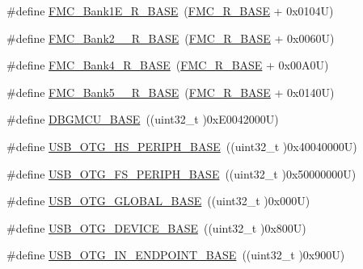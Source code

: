 \begin{DoxyCompactItemize}
\item 
\#define \hyperlink{group___peripheral__memory__map_gad82d3a6bac014fa645fb67a63fae4bc0}{F\+M\+C\+\_\+\+Bank1\+E\+\_\+\+R\+\_\+\+B\+A\+SE}~(\hyperlink{group___peripheral__memory__map_ga7a599164cd92798542bc6288793d1ed5}{F\+M\+C\+\_\+\+R\+\_\+\+B\+A\+SE} + 0x0104\+U)
\item 
\#define \hyperlink{group___peripheral__memory__map_ga48c2af45e9b49fa719236a2e71d2f8b2}{F\+M\+C\+\_\+\+Bank2\+\_\+\_\+\+R\+\_\+\+B\+A\+SE}~(\hyperlink{group___peripheral__memory__map_ga7a599164cd92798542bc6288793d1ed5}{F\+M\+C\+\_\+\+R\+\_\+\+B\+A\+SE} + 0x0060\+U)
\item 
\#define \hyperlink{group___peripheral__memory__map_gadca715802374c00fafb6b4eb3e4d9a91}{F\+M\+C\+\_\+\+Bank4\+\_\+\+R\+\_\+\+B\+A\+SE}~(\hyperlink{group___peripheral__memory__map_ga7a599164cd92798542bc6288793d1ed5}{F\+M\+C\+\_\+\+R\+\_\+\+B\+A\+SE} + 0x00\+A0\+U)
\item 
\#define \hyperlink{group___peripheral__memory__map_gace117149a4fc0d07c38cc997fe4c4a73}{F\+M\+C\+\_\+\+Bank5\+\_\+\_\+\+R\+\_\+\+B\+A\+SE}~(\hyperlink{group___peripheral__memory__map_ga7a599164cd92798542bc6288793d1ed5}{F\+M\+C\+\_\+\+R\+\_\+\+B\+A\+SE} + 0x0140\+U)
\item 
\#define \hyperlink{group___peripheral__memory__map_ga4adaf4fd82ccc3a538f1f27a70cdbbef}{D\+B\+G\+M\+C\+U\+\_\+\+B\+A\+SE}~((uint32\+\_\+t )0x\+E0042000\+U)
\item 
\#define \hyperlink{group___peripheral__memory__map_gaa405d2ebfd7e9394237b6639f16a5409}{U\+S\+B\+\_\+\+O\+T\+G\+\_\+\+H\+S\+\_\+\+P\+E\+R\+I\+P\+H\+\_\+\+B\+A\+SE}~((uint32\+\_\+t )0x40040000\+U)
\item 
\#define \hyperlink{group___peripheral__memory__map_gaa86d4c80849a74938924e73937b904e7}{U\+S\+B\+\_\+\+O\+T\+G\+\_\+\+F\+S\+\_\+\+P\+E\+R\+I\+P\+H\+\_\+\+B\+A\+SE}~((uint32\+\_\+t )0x50000000\+U)
\item 
\#define \hyperlink{group___peripheral__memory__map_ga044aa4388e72d9d47a03f387fb8926fb}{U\+S\+B\+\_\+\+O\+T\+G\+\_\+\+G\+L\+O\+B\+A\+L\+\_\+\+B\+A\+SE}~((uint32\+\_\+t )0x000\+U)
\item 
\#define \hyperlink{group___peripheral__memory__map_ga4d74a337597a77b1fca978202b519a18}{U\+S\+B\+\_\+\+O\+T\+G\+\_\+\+D\+E\+V\+I\+C\+E\+\_\+\+B\+A\+SE}~((uint32\+\_\+t )0x800\+U)
\item 
\#define \hyperlink{group___peripheral__memory__map_gad8f69041452615aeb3948600e3882246}{U\+S\+B\+\_\+\+O\+T\+G\+\_\+\+I\+N\+\_\+\+E\+N\+D\+P\+O\+I\+N\+T\+\_\+\+B\+A\+SE}~((uint32\+\_\+t )0x900\+U)

\end{DoxyCompactItemize}
